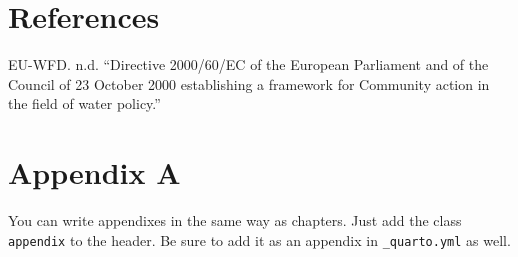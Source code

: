 \documentclass[
  a4paper,
  twoside]{uoe-thesis-template}
\newlength{\cslhangindent}
\newenvironment{CSLReferences}[2] %
 {\begin{list}{}{%
  \setlength{\itemindent}{0pt}
  \setlength{\leftmargin}{0pt}
  \setlength{\parsep}{0pt}
  \ifodd #1
   \setlength{\leftmargin}{\cslhangindent}
   \setlength{\itemindent}{-1\cslhangindent}
  \fi
  \setlength{\itemsep}{#2\baselineskip}}}
 {\end{list}}
\begin{document}

\chapter*{References}\label{references}


\label{refs}
\begin{CSLReferences}{1}{0}
EU-WFD. n.d. {``{Directive 2000/60/EC of the European Parliament and of
the Council of 23 October 2000 establishing a framework for Community
action in the field of water policy}.''}

\end{CSLReferences}

\cleardoublepage
{}
{}
\appendix

\chapter{Appendix A}\label{appendix-a}

You can write appendixes in the same way as chapters. Just add the class
\texttt{appendix} to the header. Be sure to add it as an appendix in
\texttt{\_quarto.yml} as well.
\end{document}
